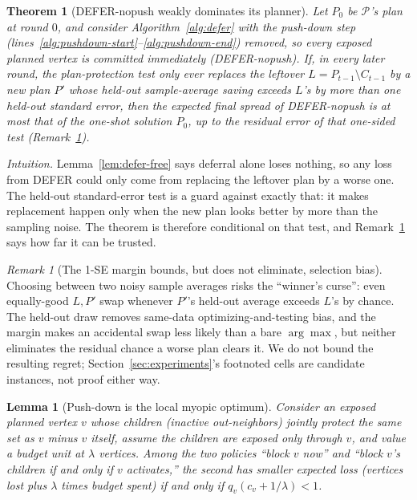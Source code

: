 \documentclass[11pt]{article}
\newtheorem{theorem}{Theorem}
\newtheorem{lemma}{Lemma}
\theoremstyle{definition}
\theoremstyle{remark}
\newtheorem{remark}{Remark}
\begin{document}
\begin{theorem}[DEFER-nopush weakly dominates its planner]\label{thm:defer-dominates}
Let $P_0$ be $\mathcal P$'s plan at round $0$, and consider Algorithm~\ref{alg:defer}
with the push-down step (lines~\ref{alg:pushdown-start}--\ref{alg:pushdown-end})
removed, so every exposed planned vertex is committed immediately
(DEFER-nopush). If, in every later round, the plan-protection test
only ever replaces the leftover $L=P_{t-1}\setminus C_{t-1}$ by a new plan
$P'$ whose held-out sample-average saving exceeds $L$'s by more than one
held-out standard error, then the expected final spread of
DEFER-nopush is at most that of the one-shot solution $P_0$, up to
the residual error of that one-sided test (Remark~\ref{rem:winners-curse}).
\end{theorem}

\emph{Intuition.} Lemma~\ref{lem:defer-free} says deferral alone loses
nothing, so any loss from DEFER could only come from replacing the leftover
plan by a worse one. The held-out standard-error test is a guard against
exactly that: it makes replacement happen only when the new plan looks
better by more than the sampling noise. The theorem is therefore
conditional on that test, and Remark~\ref{rem:winners-curse} says how far it
can be trusted.

\begin{remark}[The 1-SE margin bounds, but does not eliminate, selection
bias]\label{rem:winners-curse}
Choosing between two noisy sample averages risks the ``winner's curse'':
even equally-good $L,P'$ swap whenever $P'$'s held-out average exceeds
$L$'s by chance. The held-out draw removes same-data optimizing-and-testing
bias, and the margin makes an accidental swap less likely than a bare
$\arg\max$, but neither eliminates the residual chance a worse plan clears
it. We do not bound the resulting regret; Section~\ref{sec:experiments}'s
footnoted cells are candidate instances, not proof either way.
\end{remark}

\begin{lemma}[Push-down is the local myopic optimum]\label{lem:pushdown}
Consider an exposed planned vertex $v$ whose children (inactive
out-neighbors) jointly protect the same set as $v$ minus $v$ itself, assume
the children are exposed only through $v$, and value a budget unit at
$\lambda$ vertices. Among the two policies ``block $v$ now'' and ``block
$v$'s children if and only if $v$ activates,'' the second has smaller
expected loss (vertices lost plus $\lambda$ times budget spent) if and only
if $q_v(c_v+1/\lambda)<1$.
\end{lemma}
\end{document}
